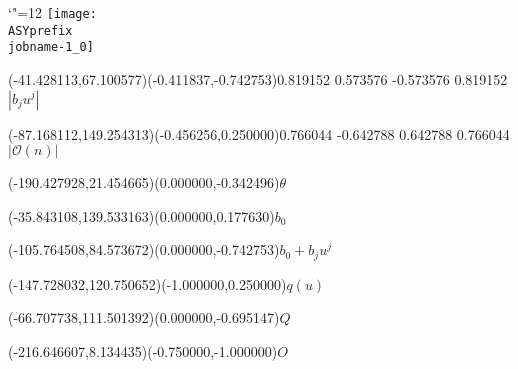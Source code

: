 \setlength{\unitlength}{1pt}%
\makeatletter%
\let\ASYencoding\f@encoding%
\let\ASYfamily\f@family%
\let\ASYseries\f@series%
\let\ASYshape\f@shape%
\makeatother%
{\catcode`"=12%
\texttt{[image: \\ASYprefix\\jobname-1\_0]}%
}%
%
\fontsize{10.000000}{12.000000}\selectfont%
\usefont{\ASYencoding}{\ASYfamily}{\ASYseries}{\ASYshape}%
\ASYalignT(-41.428113,67.100577)(-0.411837,-0.742753){0.819152 0.573576 -0.573576 0.819152}{$|b_ju^j|$}%
%
\fontsize{10.000000}{12.000000}\selectfont%
\ASYalignT(-87.168112,149.254313)(-0.456256,0.250000){0.766044 -0.642788 0.642788 0.766044}{$|\mathcal O(n)|$}%
%
\fontsize{10.000000}{12.000000}\selectfont%
\ASYalign(-190.427928,21.454665)(0.000000,-0.342496){$\theta$}%
%
\fontsize{10.000000}{12.000000}\selectfont%
\ASYalign(-35.843108,139.533163)(0.000000,0.177630){$b_0$}%
%
\fontsize{10.000000}{12.000000}\selectfont%
\ASYalign(-105.764508,84.573672)(0.000000,-0.742753){$b_0+b_ju^j$}%
%
\fontsize{10.000000}{12.000000}\selectfont%
\ASYalign(-147.728032,120.750652)(-1.000000,0.250000){$q(u)$}%
%
\fontsize{10.000000}{12.000000}\selectfont%
\ASYalign(-66.707738,111.501392)(0.000000,-0.695147){$Q$}%
%
\fontsize{10.000000}{12.000000}\selectfont%
\ASYalign(-216.646607,8.134435)(-0.750000,-1.000000){$O$}%
